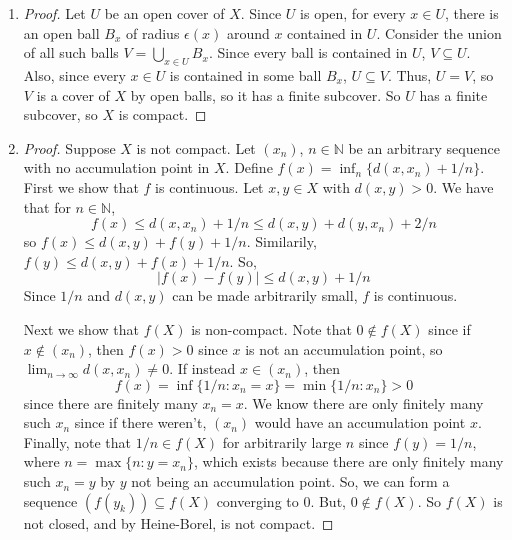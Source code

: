 \documentclass[11pt, letterpaper]{article}
\begin{document}
\thispagestyle{firststyle}


\begin{enumerate}
  \item \begin{proof}
    Let $U$ be an open cover of $X$. Since $U$ is open, for every $x \in U$, there is an open ball $B_x$ of radius $\epsilon(x)$ around $x$ contained in $U$. Consider the union of all such balls $V = \bigcup_{x \in U} B_x$. Since every ball is contained in $U$, $V \subseteq U$. Also, since every $x \in U$ is contained in some ball $B_x$, $U \subseteq V$. Thus, $U = V$, so $V$ is a cover of $X$ by open balls, so it has a finite subcover. So $U$ has a finite subcover, so $X$ is compact.
  \end{proof}

  \item \begin{proof}
    Suppose $X$ is not compact. Let $(x_n)$, $n \in \mathbb N$ be an arbitrary sequence with no accumulation point in $X$. Define $f(x) = \inf_n \lbrace d(x, x_n) + 1/n \rbrace$. First we show that $f$ is continuous. Let $x, y \in X$ with $d(x, y) > 0$. We have that for $n \in \mathbb N$,
    $$f(x) \leq d(x, x_n) + 1/n \leq d(x, y) + d(y, x_n) + 2/n$$
    so $f(x) \leq d(x, y) + f(y) + 1/n$. Similarily, $f(y) \leq d(x, y) + f(x) + 1/n$. So,
    $$
    \vert f(x) - f(y) \vert \leq d(x, y) + 1/n
    $$
    Since $1/n$ and $d(x, y)$ can be made arbitrarily small, $f$ is continuous.

    Next we show that $f(X)$ is non-compact. Note that $0 \not\in f(X)$ since if $x \not\in (x_n)$, then $f(x) > 0$ since $x$ is not an accumulation point, so $\lim_{n \to \infty} d(x, x_n) \neq 0$. If instead $x \in (x_n)$, then
    $$f(x) = \inf \lbrace 1/n : x_n = x \rbrace = \min \lbrace 1/n : x_n \rbrace > 0$$ 
    since there are finitely many $x_n = x$. We know there are only finitely many such $x_n$ since if there weren't, $(x_n)$ would have an accumulation point $x$. Finally, note that $1/n \in f(X)$ for arbitrarily large $n$ since $f(y) = 1/n$, where $n = \max\lbrace n : y = x_n\rbrace$, which exists because there are only finitely many such $x_n = y$ by $y$ not being an accumulation point. So, we can form a sequence $(f(y_k)) \subseteq f(X)$ converging to $0$. But, $0 \not\in f(X)$. So $f(X)$ is not closed, and by Heine-Borel, is not compact.


  \end{proof}
\end{enumerate}
\end{document}
